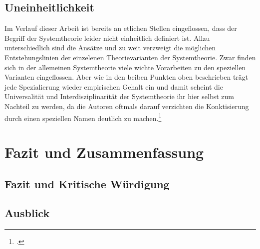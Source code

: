\documentclass[a4paper,12pt]{article}
\begin{document}
\subsection{Uneinheitlichkeit}
Im Verlauf dieser Arbeit ist bereits an etlichen Stellen eingeflossen, dass der Begriff der Systemtheorie leider nicht einheitlich definiert ist. Allzu unterschiedlich sind die Ansätze und zu weit verzweigt die möglichen Entstehungslinien der einzelenen Theorievarianten der Systemtheorie. Zwar finden sich in der allemeinen Systemtheorie viele wichte Vorarbeiten zu den speziellen Varianten eingeflossen. Aber wie in den beiben Punkten oben beschrieben trägt jede Spezialierung wieder empirischen Gehalt ein und damit scheint die Universalität und Interdisziplinarität der Systemtheorie ihr hier selbst zum Nachteil zu werden, da die Autoren oftmals darauf verzichten die Konktisierung durch einen speziellen Namen deutlich zu machen.\footcite[S. 12]{Luhmann1999}
\newpage

\section{Fazit und Zusammenfassung}
\subsection{Fazit und Kritische Würdigung}
\subsection{Ausblick}


\newpage




\printbibliography
% 
% 
\end{document}
